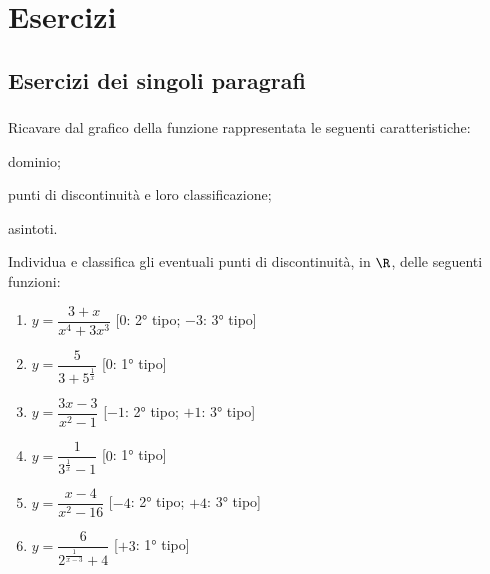 
\section{Esercizi}

\subsection{Esercizi dei singoli paragrafi}

\subsubsection*{}

\begin{esercizio}\label{ese:03.1}
Ricavare dal grafico della funzione rappresentata le seguenti 
caratteristiche:
 \begin{enumeratea}
  \item  dominio;
  \item  punti di discontinuità e loro classificazione;
  \item  asintoti.
 \end{enumeratea}
\begin{center}\continuitagraficoese\end{center} %
\end{esercizio}

\begin{esercizio}\label{ese:03.1}
Individua e classifica gli eventuali punti di discontinuità, in \(\R\), 
delle seguenti funzioni:
\begin{multicols}{2}
 \begin{enumerate} [label=\alph*]
  \item \(y = \dfrac{3 + x}{x^4 + 3 x^3}\)
   \hfill[\(0\): 2° tipo; \(-3\): 3° tipo]
  \item \(y = \dfrac{5}{3 + 5^{\frac{1}{x}}}\)
   \hfill[\(0\): 1° tipo]
  \item \(y = \dfrac{3 x - 3}{x^2 - 1}\)
   \hfill[\(-1\): 2° tipo; \(+1\): 3° tipo]
  \item \(y = \dfrac{1}{3^{\frac{1}{x}}-1}\)
   \hfill[\(0\): 1° tipo]
  \item \(y = \dfrac{x - 4}{x^2 - 16}\)
   \hfill[\(-4\): 2° tipo; \(+4\): 3° tipo]
  \item \(y = \dfrac{6}{2^{\frac{1}{x-3}} + 4}\)
   \hfill[\(+3\): 1° tipo]
 \end{enumerate}
\end{multicols}
\end{esercizio}

